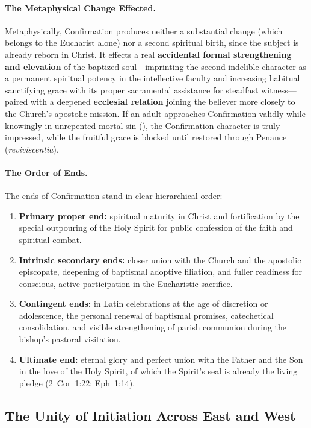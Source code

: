 \paragraph{The Metaphysical Change Effected.}
Metaphysically, Confirmation produces neither a substantial change (which belongs to the Eucharist alone) nor a second spiritual birth, since the subject is already reborn in Christ. It effects a real \textbf{accidental formal strengthening and elevation} of the baptized soul---imprinting the second indelible character as a permanent spiritual potency in the intellective faculty and increasing habitual sanctifying grace with its proper sacramental assistance for steadfast witness---paired with a deepened \textbf{ecclesial relation} joining the believer more closely to the Church's apostolic mission. If an adult approaches Confirmation validly while knowingly in unrepented mortal sin (), the Confirmation character is truly impressed, while the fruitful grace is blocked until restored through Penance (\emph{reviviscentia}).

\paragraph{The Order of Ends.}
The ends of Confirmation stand in clear hierarchical order:
\begin{enumerate}
  \item \textbf{Primary proper end:} spiritual maturity in Christ and fortification by the special outpouring of the Holy Spirit for public confession of the faith and spiritual combat.
  \item \textbf{Intrinsic secondary ends:} closer union with the Church and the apostolic episcopate, deepening of baptismal adoptive filiation, and fuller readiness for conscious, active participation in the Eucharistic sacrifice.
  \item \textbf{Contingent ends:} in Latin celebrations at the age of discretion or adolescence, the personal renewal of baptismal promises, catechetical consolidation, and visible strengthening of parish communion during the bishop's pastoral visitation.
  \item \textbf{Ultimate end:} eternal glory and perfect union with the Father and the Son in the love of the Holy Spirit, of which the Spirit's seal is already the living pledge (2~Cor~1:22; Eph~1:14).
\end{enumerate}

\subsection{The Unity of Initiation Across East and West}
\label{subsec:confirmation-unity}

